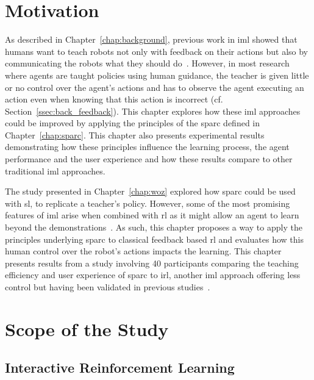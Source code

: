 \newpage
\section{Motivation}

As described in Chapter~\ref{chap:background}, previous work in \gls{iml} showed that humans want to teach robots not only with feedback on their actions but also by communicating the robots what they should do~\citep{thomaz2008teachable,amershi2014power}. However, in most research where agents are taught policies using human guidance, the teacher is given little or no control over the agent's actions and has to observe the agent executing an action even when knowing that this action is incorrect (cf. Section~\ref{ssec:back_feedback}). This chapter explores how these \gls{iml} approaches could be improved by applying the principles of the \gls{sparc} defined in Chapter~\ref{chap:sparc}. This chapter also presents experimental results demonstrating how these principles influence the learning process, the agent performance and the user experience and how these results compare to other traditional \gls{iml} approaches.

The study presented in Chapter~\ref{chap:woz} explored how \gls{sparc} could be used with \acrlong{sl}, to replicate a teacher's policy. However, some of the most promising features of \gls{iml} arise when combined with \gls{rl} as it might allow an agent to learn beyond the demonstrations~\citep{abbeel2004apprenticeship}. As such, this chapter proposes a way to apply the principles underlying \gls{sparc} to classical feedback based \gls{rl} and evaluates how this human control over the robot's actions impacts the learning. This chapter presents results from a study involving 40 participants comparing the teaching efficiency and user experience of \gls{sparc} to \gls{irl}, another \gls{iml} approach offering less control but having been validated in previous studies~\citep{thomaz2008teachable}. %

\section{Scope of the Study}


\subsection{Interactive Reinforcement Learning}

